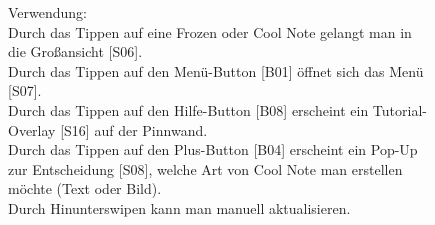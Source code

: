 \documentclass[a4paper]{scrreprt}
\begin{document}
\begin{figure}[h]
\begin{minipage}[b]{0.55\linewidth}
\begin{itemize}
    			\end{itemize}
    			
    			\hfill
    			
    			Verwendung:\\
    			Durch das Tippen auf eine Frozen oder Cool
    			Note gelangt man in die Großansicht {[}S06{]}.
    			\\
    			Durch das Tippen auf den Menü-Button {[}B01{]} 
    			öffnet sich das Menü {[}S07{]}.\\
    			Durch das Tippen auf den Hilfe-Button  {[}B08{]} erscheint
    			ein Tutorial-Overlay {[}S16{]} auf der Pinnwand.	\\
    			Durch das Tippen auf den  Plus-Button [B04]  erscheint 
    			ein Pop-Up zur Entscheidung {[}S08{]}, welche Art von Cool Note man erstellen möchte (Text oder
    			Bild).\\
    			Durch Hinunterswipen kann man manuell aktualisieren.
    			
    		\end{minipage}
    	\end{figure}
    	
    	
    
    	
    	
    	
    	
    	\clearpage
    	
\end{document}
